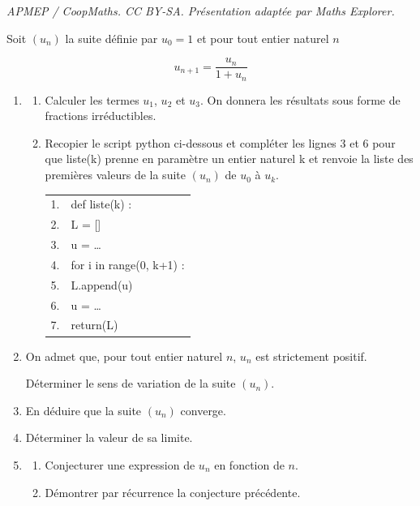 \documentclass[10pt]{article}
\begin{document}
\noindent\textit{APMEP / CoopMaths. CC BY-SA. Présentation adaptée par Maths Explorer.}\par\medskip
\medskip

Soit $\left(u_n\right)$ la suite définie par $u_0 = 1$ et pour tout entier naturel $n$

\[u_{n+1} = \dfrac{u_n}{1 + u_n}\]

\begin{enumerate}
\item 
	\begin{enumerate}
		\item Calculer les termes $u_1$, $u_2$  et $u_3$. On  donnera les résultats sous forme de fractions irréductibles.
		\item Recopier le script python ci-dessous et compléter les lignes 3 et 6 pour que liste(k) prenne en paramètre un entier naturel k et renvoie la liste des premières valeurs de la suite $\left(u_n\right)$ de $u_0$ à $u_k$.

\begin{center}
\begin{tabularx}{0.5\linewidth}{|l|X|}\hline
1.&def liste(k) :\\
2.&\qquad L = []\\
3.&\qquad u = \ldots\\
4.&\qquad for i in range(0, k+1) :\\
5.&\quad \qquad L.append(u)\\
6.&\quad \qquad u = \ldots\\
7.&\qquad return(L)\\ \hline
\end{tabularx}
\end{center}
	\end{enumerate}
\item On admet que, pour tout entier naturel $n$, $u_n$ est strictement positif.

Déterminer le sens de variation de la suite $\left(u_n\right)$.
\item En déduire que la suite $\left(u_n\right)$ converge.
\item Déterminer la valeur de sa limite.
\item 
	\begin{enumerate}
		\item Conjecturer une expression de $u_n$ en fonction de $n$.
		\item Démontrer par récurrence la conjecture précédente.
	\end{enumerate}
\end{enumerate}

\bigskip
\end{document}
